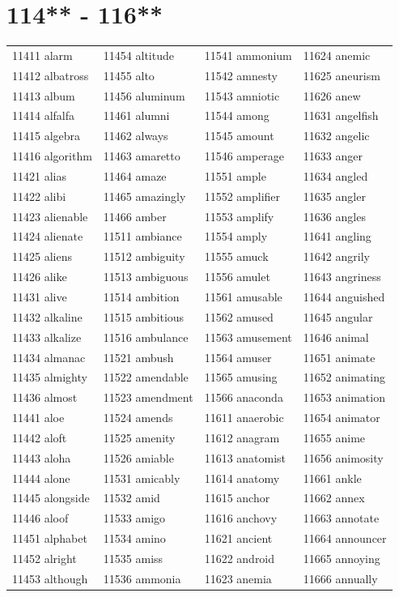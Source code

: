 \documentclass[10pt, oneside]{book}
\begin{document}
\begin{table}
	\centering
	\section*{114** - 116**}
	\begin{tabular}{l l l l}
11411 alarm &11454 altitude &11541 ammonium &11624 anemic\\
11412 albatross &11455 alto &11542 amnesty &11625 aneurism\\
11413 album &11456 aluminum &11543 amniotic &11626 anew\\
11414 alfalfa &11461 alumni &11544 among &11631 angelfish\\
11415 algebra &11462 always &11545 amount &11632 angelic\\
11416 algorithm &11463 amaretto &11546 amperage &11633 anger\\
11421 alias &11464 amaze &11551 ample &11634 angled\\
11422 alibi &11465 amazingly &11552 amplifier &11635 angler\\
11423 alienable &11466 amber &11553 amplify &11636 angles\\
11424 alienate &11511 ambiance &11554 amply &11641 angling\\
11425 aliens &11512 ambiguity &11555 amuck &11642 angrily\\
11426 alike &11513 ambiguous &11556 amulet &11643 angriness\\
11431 alive &11514 ambition &11561 amusable &11644 anguished\\
11432 alkaline &11515 ambitious &11562 amused &11645 angular\\
11433 alkalize &11516 ambulance &11563 amusement &11646 animal\\
11434 almanac &11521 ambush &11564 amuser &11651 animate\\
11435 almighty &11522 amendable &11565 amusing &11652 animating\\
11436 almost &11523 amendment &11566 anaconda &11653 animation\\
11441 aloe &11524 amends &11611 anaerobic &11654 animator\\
11442 aloft &11525 amenity &11612 anagram &11655 anime\\
11443 aloha &11526 amiable &11613 anatomist &11656 animosity\\
11444 alone &11531 amicably &11614 anatomy &11661 ankle\\
11445 alongside &11532 amid &11615 anchor &11662 annex\\
11446 aloof &11533 amigo &11616 anchovy &11663 annotate\\
11451 alphabet &11534 amino &11621 ancient &11664 announcer\\
11452 alright &11535 amiss &11622 android &11665 annoying\\
11453 although &11536 ammonia &11623 anemia &11666 annually\\
	\end{tabular}
 \end{table}
\clearpage
\end{document}
